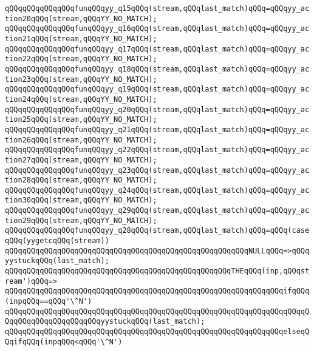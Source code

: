 \verb|qQQqqQQqqQQqqQQqfunqQQqyy_q15qQQq(stream,qQQqlast_match)qQQq=qQQqyy_action20qQQq(stream,qQQqYY_NO_MATCH);|\newline
\verb|qQQqqQQqqQQqqQQqfunqQQqyy_q16qQQq(stream,qQQqlast_match)qQQq=qQQqyy_action21qQQq(stream,qQQqYY_NO_MATCH);|\newline
\verb|qQQqqQQqqQQqqQQqfunqQQqyy_q17qQQq(stream,qQQqlast_match)qQQq=qQQqyy_action22qQQq(stream,qQQqYY_NO_MATCH);|\newline
\verb|qQQqqQQqqQQqqQQqfunqQQqyy_q18qQQq(stream,qQQqlast_match)qQQq=qQQqyy_action23qQQq(stream,qQQqYY_NO_MATCH);|\newline
\verb|qQQqqQQqqQQqqQQqfunqQQqyy_q19qQQq(stream,qQQqlast_match)qQQq=qQQqyy_action24qQQq(stream,qQQqYY_NO_MATCH);|\newline
\verb|qQQqqQQqqQQqqQQqfunqQQqyy_q20qQQq(stream,qQQqlast_match)qQQq=qQQqyy_action25qQQq(stream,qQQqYY_NO_MATCH);|\newline
\verb|qQQqqQQqqQQqqQQqfunqQQqyy_q21qQQq(stream,qQQqlast_match)qQQq=qQQqyy_action26qQQq(stream,qQQqYY_NO_MATCH);|\newline
\verb|qQQqqQQqqQQqqQQqfunqQQqyy_q22qQQq(stream,qQQqlast_match)qQQq=qQQqyy_action27qQQq(stream,qQQqYY_NO_MATCH);|\newline
\verb|qQQqqQQqqQQqqQQqfunqQQqyy_q23qQQq(stream,qQQqlast_match)qQQq=qQQqyy_action28qQQq(stream,qQQqYY_NO_MATCH);|\newline
\verb|qQQqqQQqqQQqqQQqfunqQQqyy_q24qQQq(stream,qQQqlast_match)qQQq=qQQqyy_action30qQQq(stream,qQQqYY_NO_MATCH);|\newline
\verb|qQQqqQQqqQQqqQQqfunqQQqyy_q29qQQq(stream,qQQqlast_match)qQQq=qQQqyy_action29qQQq(stream,qQQqYY_NO_MATCH);|\newline
\verb|qQQqqQQqqQQqqQQqfunqQQqyy_q28qQQq(stream,qQQqlast_match)qQQq=qQQq(caseqQQq(yygetcqQQq(stream))|\newline
\verb|qQQqqQQqqQQqqQQqqQQqqQQqqQQqqQQqqQQqqQQqqQQqqQQqqQQqqQQqNULLqQQq=>qQQqyystuckqQQq(last_match);|\newline
\verb|qQQqqQQqqQQqqQQqqQQqqQQqqQQqqQQqqQQqqQQqqQQqqQQqqQQqTHEqQQq(inp,qQQqstream')qQQq=>|\newline
\verb|qQQqqQQqqQQqqQQqqQQqqQQqqQQqqQQqqQQqqQQqqQQqqQQqqQQqqQQqqQQqqQQqifqQQq(inpqQQq==qQQq'\^N')|\newline
\verb|qQQqqQQqqQQqqQQqqQQqqQQqqQQqqQQqqQQqqQQqqQQqqQQqqQQqqQQqqQQqqQQqqQQqqQQqqQQqqQQqqQQqqQQqqQQqyystuckqQQq(last_match);|\newline
\verb|qQQqqQQqqQQqqQQqqQQqqQQqqQQqqQQqqQQqqQQqqQQqqQQqqQQqqQQqqQQqqQQqelseqQQqifqQQq(inpqQQq<qQQq'\^N')|\newline
